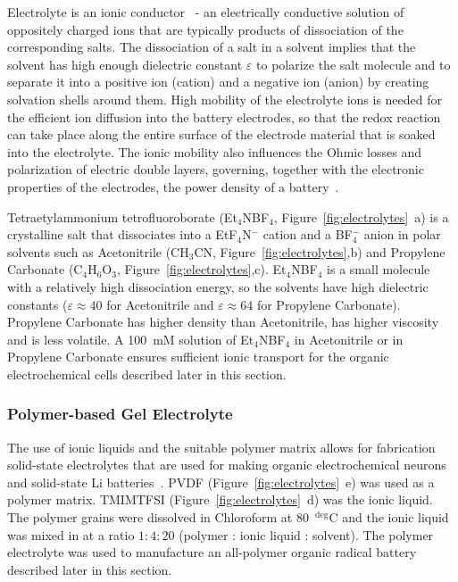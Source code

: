 Electrolyte is an ionic conductor~\cite{Bard_book} - an electrically conductive solution of oppositely charged ions that are typically products of dissociation of the corresponding salts. The dissociation of a salt in a solvent implies that the solvent has high enough dielectric constant $\varepsilon$ to polarize the salt molecule and to separate it into a positive ion (cation) and a negative ion (anion) by creating solvation shells around them. High mobility of the electrolyte ions is needed for the efficient ion diffusion into the battery electrodes, so that the redox reaction can take place along the entire surface of the electrode material that is soaked into the electrolyte. The ionic mobility also influences the Ohmic losses and polarization of electric double layers, governing, together with the electronic properties of the electrodes, the power density of a battery~\cite{Neueder2014}.\\

\par{}
Tetraetylammonium tetrofluoroborate (Et$_4$NBF$_4$, Figure~\ref{fig:electrolytes}~a) is a crystalline salt that dissociates into a EtF$_4$N$^-$ cation and a BF$_4^-$ anion in polar solvents such as Acetonitrile (CH$_3$CN, Figure~\ref{fig:electrolytes},b) and Propylene Carbonate (C$_4$H$_6$O$_3$, Figure~\ref{fig:electrolytes},c). Et$_4$NBF$_4$ is a small molecule with a relatively high dissociation energy, so the solvents have high dielectric constants ($\varepsilon\approx40$ for Acetonitrile and $\varepsilon\approx64$ for Propylene Carbonate). Propylene Carbonate has higher density than Acetonitrile, has higher viscosity and is less volatile. A 100~mM solution of Et$_4$NBF$_4$ in Acetonitrile or in Propylene Carbonate ensures sufficient ionic transport for the organic electrochemical cells described later in this section.

\subsubsection{Polymer-based Gel Electrolyte}
The use of ionic liquids and the suitable polymer matrix allows for fabrication solid-state electrolytes that are used for making organic electrochemical neurons~\cite{Harikesh2022} and solid-state Li batteries~\cite{Pang2021}. PVDF (Figure~\ref{fig:electrolytes}~e) was used as a polymer matrix. TMIMTFSI (Figure~\ref{fig:electrolytes}~d) was the ionic liquid. The polymer grains were dissolved in Chloroform at 80~$^{\deg}$C and the ionic liquid was mixed in at a ratio $1:4:20$ (polymer : ionic liquid : solvent). The polymer electrolyte was used to manufacture an all-polymer organic radical battery described later in this section.


